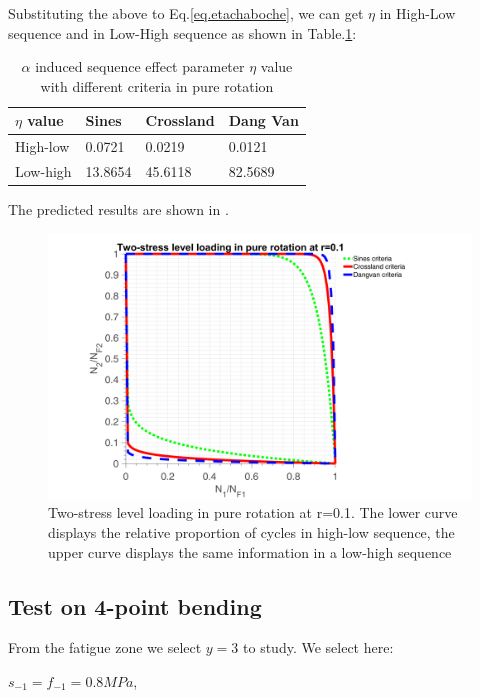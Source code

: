 Substituting the above to Eq.\eqref{eq.etachaboche}, we can get $\eta$ in High-Low sequence and in Low-High sequence as shown in Table.\ref{tab.etarotation}:

\begin{table}[!h]
	\centering
	\begin{tabular}{llll}
		\hline
		$\eta$ value   & Sines  & Crossland & Dang Van \\ \hline
		High-low & 0.0721 & 0.0219    & 0.0121   \\
		Low-high & 13.8654 & 45.6118   & 82.5689  \\ \hline
	\end{tabular}
	\caption{$\alpha$ induced sequence effect parameter $\eta$ value with different criteria in pure rotation}
	\label{tab.etarotation}
\end{table}

The predicted results are shown in .

\begin{figure}[!h]
	\centering
	\includegraphics[width=\textwidth]{figures//2stressR.png} 
	\caption{Two-stress level loading in pure rotation at r=0.1. The lower curve displays the relative proportion of cycles in high-low sequence, the upper curve displays the same information in a low-high sequence}
	\label{2stressR}
\end{figure}

\newpage
\subsection{Test on 4-point bending}
From the fatigue zone we select $y=3$ to study. We select here:

$s_{-1}=f_{-1}=0.8MPa$,

